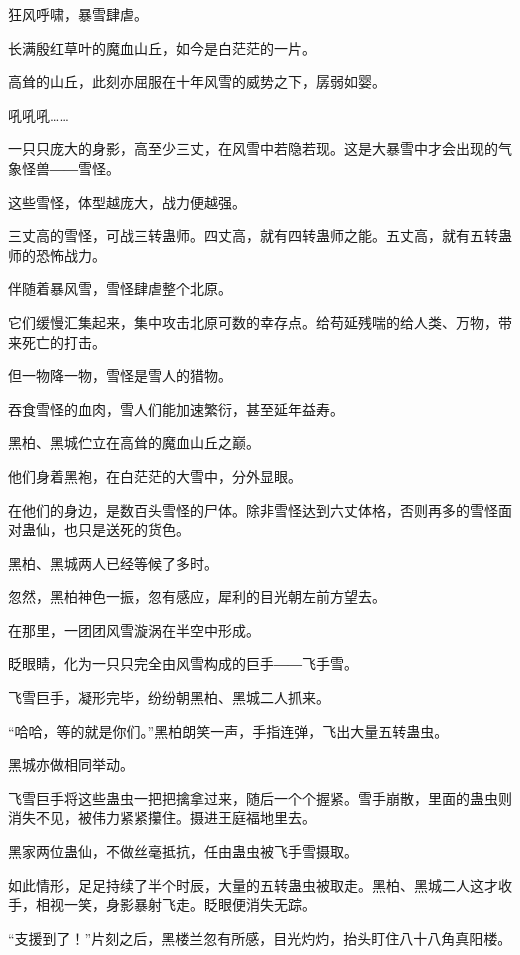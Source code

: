
\begin{this_body}

狂风呼啸，暴雪肆虐。

长满殷红草叶的魔血山丘，如今是白茫茫的一片。

高耸的山丘，此刻亦屈服在十年风雪的威势之下，孱弱如婴。

吼吼吼……

一只只庞大的身影，高至少三丈，在风雪中若隐若现。这是大暴雪中才会出现的气象怪兽――雪怪。

这些雪怪，体型越庞大，战力便越强。

三丈高的雪怪，可战三转蛊师。四丈高，就有四转蛊师之能。五丈高，就有五转蛊师的恐怖战力。

伴随着暴风雪，雪怪肆虐整个北原。

它们缓慢汇集起来，集中攻击北原可数的幸存点。给苟延残喘的给人类、万物，带来死亡的打击。

但一物降一物，雪怪是雪人的猎物。

吞食雪怪的血肉，雪人们能加速繁衍，甚至延年益寿。

黑柏、黑城伫立在高耸的魔血山丘之巅。

他们身着黑袍，在白茫茫的大雪中，分外显眼。

在他们的身边，是数百头雪怪的尸体。除非雪怪达到六丈体格，否则再多的雪怪面对蛊仙，也只是送死的货色。

黑柏、黑城两人已经等候了多时。

忽然，黑柏神色一振，忽有感应，犀利的目光朝左前方望去。

在那里，一团团风雪漩涡在半空中形成。

眨眼睛，化为一只只完全由风雪构成的巨手――飞手雪。

飞雪巨手，凝形完毕，纷纷朝黑柏、黑城二人抓来。

“哈哈，等的就是你们。”黑柏朗笑一声，手指连弹，飞出大量五转蛊虫。

黑城亦做相同举动。

飞雪巨手将这些蛊虫一把把擒拿过来，随后一个个握紧。雪手崩散，里面的蛊虫则消失不见，被伟力紧紧攥住。摄进王庭福地里去。

黑家两位蛊仙，不做丝毫抵抗，任由蛊虫被飞手雪摄取。

如此情形，足足持续了半个时辰，大量的五转蛊虫被取走。黑柏、黑城二人这才收手，相视一笑，身影暴射飞走。眨眼便消失无踪。

“支援到了！”片刻之后，黑楼兰忽有所感，目光灼灼，抬头盯住八十八角真阳楼。


\end{this_body}
